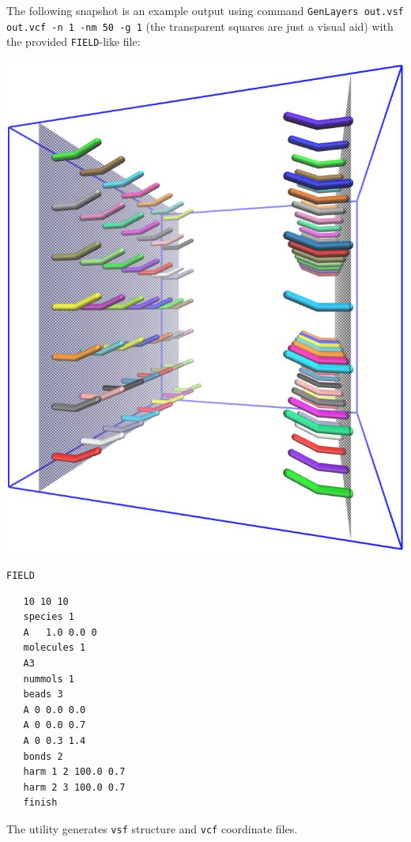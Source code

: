 The following snapshot is an example output using command \texttt{GenLayers
out.vsf out.vcf -n 1 -nm 50 -g 1} (the transparent squares are just a
visual aid) with the provided \texttt{FIELD}-like file:

\hfill
\begin{minipage}{0.4\textwidth}

  \includegraphics[width=\textwidth]{GenLayers-478ctac.jpg}
\end{minipage}
\begin{minipage}{0.5\textwidth}
  \centering
  \texttt{FIELD}
  \vspace{-1em}

\begin{verbatim}
   10 10 10
   species 1
   A   1.0 0.0 0
   molecules 1
   A3
   nummols 1
   beads 3
   A 0 0.0 0.0
   A 0 0.0 0.7
   A 0 0.3 1.4
   bonds 2
   harm 1 2 100.0 0.7
   harm 2 3 100.0 0.7
   finish
\end{verbatim}
\end{minipage}

The utility generates \texttt{vsf} structure and \texttt{vcf} coordinate
files.

